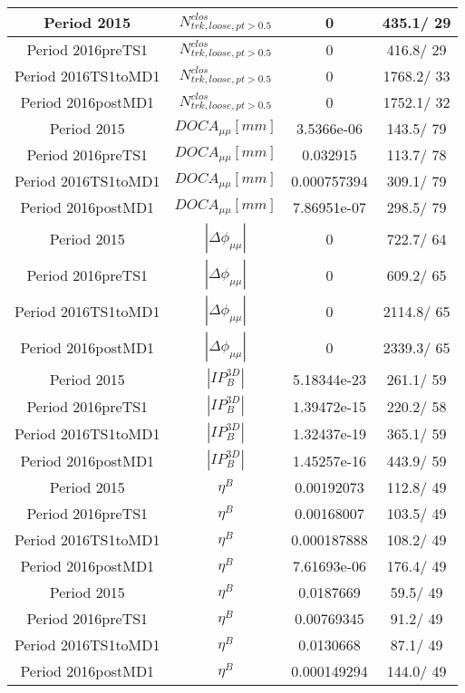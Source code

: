 \documentclass{article}
\begin{document}
\begin{longtable}{c|c|c|c}
\hline
 Period 2015 & $N^{clos}_{trk, loose, pt>0.5}$ & 0 & 435.1/ 29\\
\hline
 Period 2016preTS1 & $N^{clos}_{trk, loose, pt>0.5}$ & 0 & 416.8/ 29\\
\hline
 Period 2016TS1toMD1 & $N^{clos}_{trk, loose, pt>0.5}$ & 0 & 1768.2/ 33\\
\hline
 Period 2016postMD1 & $N^{clos}_{trk, loose, pt>0.5}$ & 0 & 1752.1/ 32\\
\hline
 Period 2015 & $DOCA_{\mu\mu} [mm]$ & 3.5366e-06 & 143.5/ 79\\
\hline
 Period 2016preTS1 & $DOCA_{\mu\mu} [mm]$ & 0.032915 & 113.7/ 78\\
\hline
 Period 2016TS1toMD1 & $DOCA_{\mu\mu} [mm]$ & 0.000757394 & 309.1/ 79\\
\hline
 Period 2016postMD1 & $DOCA_{\mu\mu} [mm]$ & 7.86951e-07 & 298.5/ 79\\
\hline
 Period 2015 & $|\Delta\phi_{\mu\mu}|$ & 0 & 722.7/ 64\\
\hline
 Period 2016preTS1 & $|\Delta\phi_{\mu\mu}|$ & 0 & 609.2/ 65\\
\hline
 Period 2016TS1toMD1 & $|\Delta\phi_{\mu\mu}|$ & 0 & 2114.8/ 65\\
\hline
 Period 2016postMD1 & $|\Delta\phi_{\mu\mu}|$ & 0 & 2339.3/ 65\\
\hline
 Period 2015 & $|IP_{B}^{3D}|$ & 5.18344e-23 & 261.1/ 59\\
\hline
 Period 2016preTS1 & $|IP_{B}^{3D}|$ & 1.39472e-15 & 220.2/ 58\\
\hline
 Period 2016TS1toMD1 & $|IP_{B}^{3D}|$ & 1.32437e-19 & 365.1/ 59\\
\hline
 Period 2016postMD1 & $|IP_{B}^{3D}|$ & 1.45257e-16 & 443.9/ 59\\
\hline
 Period 2015 & $\eta^{B}$ & 0.00192073 & 112.8/ 49\\
\hline
 Period 2016preTS1 & $\eta^{B}$ & 0.00168007 & 103.5/ 49\\
\hline
 Period 2016TS1toMD1 & $\eta^{B}$ & 0.000187888 & 108.2/ 49\\
\hline
 Period 2016postMD1 & $\eta^{B}$ & 7.61693e-06 & 176.4/ 49\\
\hline
 Period 2015 & $\eta^{B}$ & 0.0187669 &  59.5/ 49\\
\hline
 Period 2016preTS1 & $\eta^{B}$ & 0.00769345 &  91.2/ 49\\
\hline
 Period 2016TS1toMD1 & $\eta^{B}$ & 0.0130668 &  87.1/ 49\\
\hline
 Period 2016postMD1 & $\eta^{B}$ & 0.000149294 & 144.0/ 49\\

\end{longtable}
\end{document}
